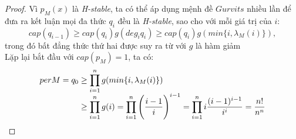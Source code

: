 \documentclass[a4paper, 12pt]{report}
\begin{document}
\begin{proof}
Vì $p_M(x)$ là \textit{H-stable}, ta có thể áp dụng mệnh đề $Gurvits$ nhiều lần để đưa ra kết luận mọi đa thức $q_i$ đều là \textit{H-stable}, sao cho với mỗi giá trị của $i$:
\begin{equation}
	cap(q_{i-1}) \geq cap(q_i)g(deg_{i}q_i) \geq cap(q_i)g(min \{i, \lambda_{M}(i)\}), 
\end{equation}
trong đó bất đẳng thức thứ hai được suy ra từ với $g$ là hàm giảm\\ 
Lặp lại     bắt đầu với $cap(p_M) =1$, ta có:
\begin{equation*}
\begin{array}{l@{}l}
	per M 
	= q_0 &{}\geq \displaystyle \prod_{i=1}^{n} g(min \{i,\lambda_M(i) \} )\\
	&{}\geq \displaystyle \prod_{i=1}^{n}g(i) = \displaystyle \prod_{i=1}^{n} \Bigg( \frac{i-1}{i} \Bigg)^{i-1} = \displaystyle \prod_{i=1}^{n}i\frac{(i-1)^{i-1}}{i^i} = \frac{n!}{n^n}
\end{array}
\end{equation*}



\end{proof}
\end{document}
